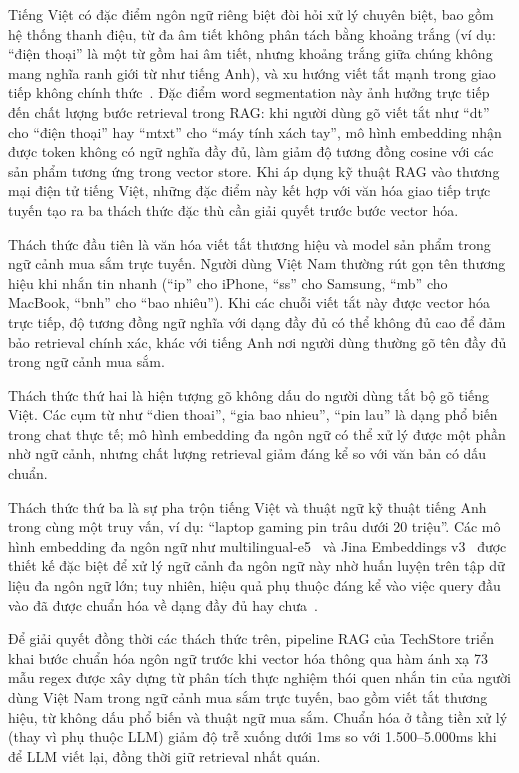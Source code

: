 Tiếng Việt có đặc điểm ngôn ngữ riêng biệt đòi hỏi xử lý chuyên biệt, bao gồm hệ thống thanh điệu, từ đa âm tiết không phân tách bằng khoảng trắng (ví dụ: ``điện thoại'' là một từ gồm hai âm tiết, nhưng khoảng trắng giữa chúng không mang nghĩa ranh giới từ như tiếng Anh), và xu hướng viết tắt mạnh trong giao tiếp không chính thức~\cite{nguyen2018vncorenlp}. Đặc điểm word segmentation này ảnh hưởng trực tiếp đến chất lượng bước retrieval trong RAG: khi người dùng gõ viết tắt như ``dt'' cho ``điện thoại'' hay ``mtxt'' cho ``máy tính xách tay'', mô hình embedding nhận được token không có ngữ nghĩa đầy đủ, làm giảm độ tương đồng cosine với các sản phẩm tương ứng trong vector store. Khi áp dụng kỹ thuật RAG vào thương mại điện tử tiếng Việt, những đặc điểm này kết hợp với văn hóa giao tiếp trực tuyến tạo ra ba thách thức đặc thù cần giải quyết trước bước vector hóa.

Thách thức đầu tiên là văn hóa viết tắt thương hiệu và model sản phẩm trong ngữ cảnh mua sắm trực tuyến. Người dùng Việt Nam thường rút gọn tên thương hiệu khi nhắn tin nhanh (``ip'' cho iPhone, ``ss'' cho Samsung, ``mb'' cho MacBook, ``bnh'' cho ``bao nhiêu''). Khi các chuỗi viết tắt này được vector hóa trực tiếp, độ tương đồng ngữ nghĩa với dạng đầy đủ có thể không đủ cao để đảm bảo retrieval chính xác, khác với tiếng Anh nơi người dùng thường gõ tên đầy đủ trong ngữ cảnh mua sắm.

Thách thức thứ hai là hiện tượng gõ không dấu do người dùng tắt bộ gõ tiếng Việt. Các cụm từ như ``dien thoai'', ``gia bao nhieu'', ``pin lau'' là dạng phổ biến trong chat thực tế; mô hình embedding đa ngôn ngữ có thể xử lý được một phần nhờ ngữ cảnh, nhưng chất lượng retrieval giảm đáng kể so với văn bản có dấu chuẩn.

Thách thức thứ ba là sự pha trộn tiếng Việt và thuật ngữ kỹ thuật tiếng Anh trong cùng một truy vấn, ví dụ: ``laptop gaming pin trâu dưới 20 triệu''. Các mô hình embedding đa ngôn ngữ như multilingual-e5~\cite{wang2022text} và Jina Embeddings v3~\cite{sturua2024jina} được thiết kế đặc biệt để xử lý ngữ cảnh đa ngôn ngữ này nhờ huấn luyện trên tập dữ liệu đa ngôn ngữ lớn; tuy nhiên, hiệu quả phụ thuộc đáng kể vào việc query đầu vào đã được chuẩn hóa về dạng đầy đủ hay chưa~\cite{ma2023query}.

Để giải quyết đồng thời các thách thức trên, pipeline RAG của TechStore triển khai bước chuẩn hóa ngôn ngữ trước khi vector hóa thông qua hàm ánh xạ 73 mẫu regex được xây dựng từ phân tích thực nghiệm thói quen nhắn tin của người dùng Việt Nam trong ngữ cảnh mua sắm trực tuyến, bao gồm viết tắt thương hiệu, từ không dấu phổ biến và thuật ngữ mua sắm. Chuẩn hóa ở tầng tiền xử lý (thay vì phụ thuộc LLM) giảm độ trễ xuống dưới 1ms so với 1.500--5.000ms khi để LLM viết lại, đồng thời giữ retrieval nhất quán.


